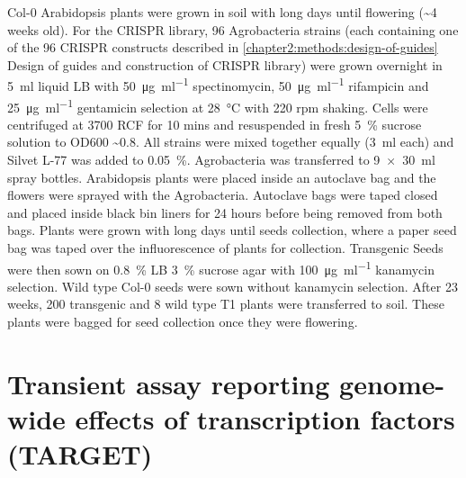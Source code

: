 \documentclass[../main.tex]{subfiles}
\begin{document}
Col-0 Arabidopsis plants were grown in soil with long days until flowering (\textasciitilde{}4 weeks old).
For the CRISPR library, 96 Agrobacteria strains (each containing one of the 96 CRISPR constructs described in \autoref{chapter2:methods:design-of-guides} Design of guides and construction of CRISPR library) were grown overnight in \SI{5}{\ml} liquid LB with \SI{50}{\micro\gram\per\ml} spectinomycin, \SI{50}{\micro\gram\per\ml} rifampicin and \SI{25}{\micro\gram\per\ml} gentamicin selection at \SI{28}{\celsius} with 220 rpm shaking.
Cells were centrifuged at 3700 RCF for 10 mins and resuspended in fresh \SI{5}{\percent} sucrose solution to OD600 \textasciitilde{}0.8.
All strains were mixed together equally (\SI{3}{\ml} each) and Silvet L-77 was added to \SI{0.05}{\percent}.
Agrobacteria was transferred to \SI{9x30}{\ml} spray bottles.
Arabidopsis plants were placed inside an autoclave bag and the flowers were sprayed with the Agrobacteria.
Autoclave bags were taped closed and placed inside black bin liners for 24 hours before being removed from both bags.
Plants were grown with long days until seeds collection, where a paper seed bag was taped over the influorescence of plants for collection.
Transgenic Seeds were then sown on \SI{0.8}{\percent} LB \SI{3}{\percent} sucrose agar with \SI{100}{\micro\gram\per\ml} kanamycin selection.
Wild type Col-0 seeds were sown without kanamycin selection.
After 2\textendash{}3 weeks, 200 transgenic and 8 wild type T1 plants were transferred to soil.
These plants were bagged for seed collection once they were flowering.

\section{Transient assay reporting genome\hyp{}wide effects of transcription factors (TARGET)}\label{chapter2:methods:TARGET}
\end{document}
